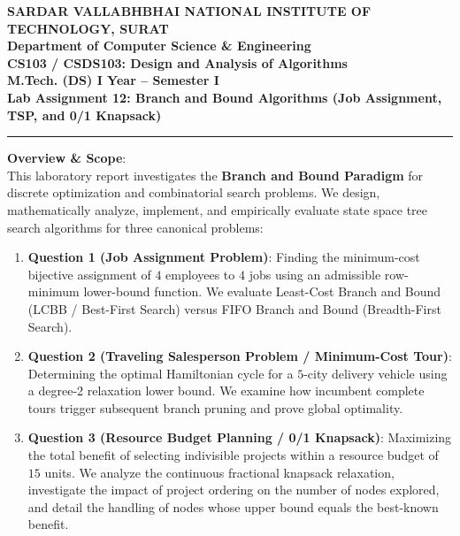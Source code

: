 \documentclass[12pt]{article}
\begin{document}
\begin{center}
\textbf{\Large SARDAR VALLABHBHAI NATIONAL INSTITUTE OF TECHNOLOGY, SURAT}\\[4pt]
\textbf{\large Department of Computer Science \& Engineering}\\[3pt]
\textbf{\large CS103 / CSDS103: Design and Analysis of Algorithms}\\[3pt]
\textbf{\large M.Tech. (DS) I Year -- Semester I}\\[4pt]
\textbf{\Large Lab Assignment 12: Branch and Bound Algorithms (Job Assignment, TSP, and 0/1 Knapsack)}
\end{center}

\vspace{0.2cm}
\hrule
\vspace{0.4cm}

\textbf{Overview \& Scope}:\\
This laboratory report investigates the \textbf{Branch and Bound Paradigm} for discrete optimization and combinatorial search problems. We design, mathematically analyze, implement, and empirically evaluate state space tree search algorithms for three canonical problems:
\begin{enumerate}
    \item \textbf{Question 1 (Job Assignment Problem)}: Finding the minimum-cost bijective assignment of $4$ employees to $4$ jobs using an admissible row-minimum lower-bound function. We evaluate Least-Cost Branch and Bound (LCBB / Best-First Search) versus FIFO Branch and Bound (Breadth-First Search).
    \item \textbf{Question 2 (Traveling Salesperson Problem / Minimum-Cost Tour)}: Determining the optimal Hamiltonian cycle for a $5$-city delivery vehicle using a degree-2 relaxation lower bound. We examine how incumbent complete tours trigger subsequent branch pruning and prove global optimality.
    \item \textbf{Question 3 (Resource Budget Planning / 0/1 Knapsack)}: Maximizing the total benefit of selecting indivisible projects within a resource budget of $15$ units. We analyze the continuous fractional knapsack relaxation, investigate the impact of project ordering on the number of nodes explored, and detail the handling of nodes whose upper bound equals the best-known benefit.
\end{enumerate}
\end{document}

